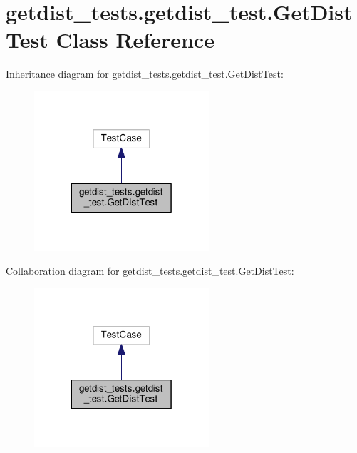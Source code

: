 \hypertarget{classgetdist__tests_1_1getdist__test_1_1GetDistTest}{}\section{getdist\+\_\+tests.\+getdist\+\_\+test.\+Get\+Dist\+Test Class Reference}
\label{classgetdist__tests_1_1getdist__test_1_1GetDistTest}


Inheritance diagram for getdist\+\_\+tests.\+getdist\+\_\+test.\+Get\+Dist\+Test\+:
\nopagebreak
\begin{figure}[H]
\begin{center}
\leavevmode
\includegraphics[width=184pt]{classgetdist__tests_1_1getdist__test_1_1GetDistTest__inherit__graph}
\end{center}
\end{figure}


Collaboration diagram for getdist\+\_\+tests.\+getdist\+\_\+test.\+Get\+Dist\+Test\+:
\nopagebreak
\begin{figure}[H]
\begin{center}
\leavevmode
\includegraphics[width=184pt]{classgetdist__tests_1_1getdist__test_1_1GetDistTest__coll__graph}
\end{center}
\end{figure}
